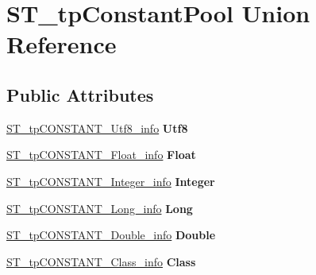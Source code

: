 \hypertarget{unionST__tpConstantPool}{}\section{S\+T\+\_\+tp\+Constant\+Pool Union Reference}
\label{unionST__tpConstantPool}
\subsection*{Public Attributes}
\begin{DoxyCompactItemize}
\item 
\mbox{\label{unionST__tpConstantPool_a013035ba00239d06ee593bcabbd66981}} 
\mbox{\hyperlink{structST__tpCONSTANT__Utf8__info}{S\+T\+\_\+tp\+C\+O\+N\+S\+T\+A\+N\+T\+\_\+\+Utf8\+\_\+info}} {\bfseries Utf8}
\item 
\mbox{\label{unionST__tpConstantPool_a2fe04b6bf703765e6e29fe98ce448cba}} 
\mbox{\hyperlink{structST__tpCONSTANT__Float__info}{S\+T\+\_\+tp\+C\+O\+N\+S\+T\+A\+N\+T\+\_\+\+Float\+\_\+info}} {\bfseries Float}
\item 
\mbox{\label{unionST__tpConstantPool_aaa40b88660a5c5e34ae3dd0d8c266b9b}} 
\mbox{\hyperlink{structST__tpCONSTANT__Integer__info}{S\+T\+\_\+tp\+C\+O\+N\+S\+T\+A\+N\+T\+\_\+\+Integer\+\_\+info}} {\bfseries Integer}
\item 
\mbox{\label{unionST__tpConstantPool_a98f11e80a02be99d4f4a1c67bdb578b0}} 
\mbox{\hyperlink{structST__tpCONSTANT__Long__info}{S\+T\+\_\+tp\+C\+O\+N\+S\+T\+A\+N\+T\+\_\+\+Long\+\_\+info}} {\bfseries Long}
\item 
\mbox{\label{unionST__tpConstantPool_aa8024c632153be7267101a40394b213a}} 
\mbox{\hyperlink{structST__tpCONSTANT__Double__info}{S\+T\+\_\+tp\+C\+O\+N\+S\+T\+A\+N\+T\+\_\+\+Double\+\_\+info}} {\bfseries Double}
\item 
\mbox{\label{unionST__tpConstantPool_a3bbf9e91af3cb79c9ac5abee2bc6d44a}} 
\mbox{\hyperlink{structST__tpCONSTANT__Class__info}{S\+T\+\_\+tp\+C\+O\+N\+S\+T\+A\+N\+T\+\_\+\+Class\+\_\+info}} {\bfseries Class}
\item 

\end{DoxyCompactItemize}
